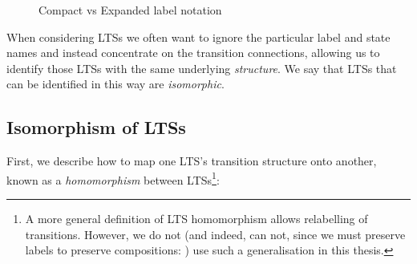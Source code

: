 \begin{figure}[ht]
    \centering
    \begin{subfigure}{0.5\textwidth}
        \centering
    \end{subfigure}%
    \begin{subfigure}{0.5\textwidth}
    \centering
    \end{subfigure}%
\caption{Compact vs Expanded label notation}
\label{fig:compactExpandedNotation}
\end{figure}

When considering LTSs we often want to ignore the particular label and state
names and instead concentrate on the transition connections, allowing us to
identify those LTSs with the same underlying \emph{structure}. We say that LTSs
that can be identified in this way are \emph{isomorphic}.

\subsection{Isomorphism of LTSs}

First, we describe how to map one LTS's transition structure onto another,
known as a \emph{homomorphism} between LTSs\footnote{A more general definition of LTS homomorphism
allows relabelling of transitions. However, we do not (and indeed, can not, since we must preserve
labels to preserve compositions: ) use such a
generalisation in this thesis. }:

